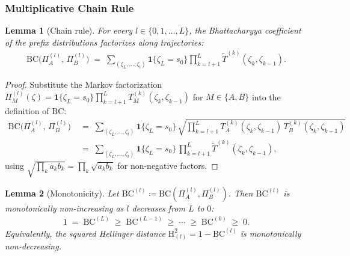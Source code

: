 \documentclass[twoside]{article}
\newcommand{\1}{\mathbf{1}}
\newtheorem{lemma}{Lemma}
\begin{document}
\subsubsection{Multiplicative Chain Rule}\label{sec:lmp-chain-rule}

\begin{lemma}[Chain rule]\label{lem:bc-chain-rule}
For every $l \in \{0, 1, \ldots, L\}$, the Bhattacharyya coefficient of the prefix distributions
factorizes along trajectories:
\begin{align}\label{eq:bc-chain-rule}
    \mathrm{BC}\!\bigl(\Pi^{(l)}_A,\, \Pi^{(l)}_B\bigr) \;=\; \sum_{(\zeta_L, \ldots, \zeta_l)}
    \mathbf{1}\{\zeta_L = s_0\} \prod_{k=l+1}^{L} \widetilde{T}^{(k)}(\zeta_k, \zeta_{k-1}).
\end{align}
\end{lemma}

\begin{proof}
Substitute the Markov factorization $\Pi^{(l)}_M(\zeta) = \mathbf{1}\{\zeta_L =
    s_0\}\prod_{k=l+1}^L T^{(k)}_M(\zeta_k, \zeta_{k-1})$ for $M \in \{A,B\}$ into the definition of
$\mathrm{BC}$:
\begin{align}
    \mathrm{BC}\!\bigl(\Pi^{(l)}_A,\, \Pi^{(l)}_B\bigr)
    &\;=\; \sum_{(\zeta_L, \ldots, \zeta_l)} \mathbf{1}\{\zeta_L = s_0\}\,
    \sqrt{\prod_{k=l+1}^{L} T^{(k)}_A(\zeta_k, \zeta_{k-1})\, T^{(k)}_B(\zeta_k, \zeta_{k-1})} \\
    &\;=\; \sum_{(\zeta_L, \ldots, \zeta_l)} \mathbf{1}\{\zeta_L = s_0\}\,
    \prod_{k=l+1}^{L} \widetilde{T}^{(k)}(\zeta_k, \zeta_{k-1}),
\end{align}
using $\sqrt{\prod_k a_k b_k} = \prod_k \sqrt{a_k b_k}$ for non-negative factors.
\end{proof}

\begin{lemma}[Monotonicity]\label{lem:bc-monotone}
Let $\mathrm{BC}^{(l)} \coloneqq \mathrm{BC}(\Pi^{(l)}_A, \Pi^{(l)}_B)$.  Then $\mathrm{BC}^{(l)}$
is monotonically non-increasing as $l$ decreases from $L$ to $0$:
\begin{align}
    1 \;=\; \mathrm{BC}^{(L)} \;\geq\; \mathrm{BC}^{(L-1)} \;\geq\; \cdots \;\geq\; \mathrm{BC}^{(0)}
    \;\geq\; 0.
\end{align}
Equivalently, the squared Hellinger distance $\mathrm{H}^{2}_{(l)} = 1 - \mathrm{BC}^{(l)}$ is
monotonically non-decreasing.
\end{lemma}
\end{document}
